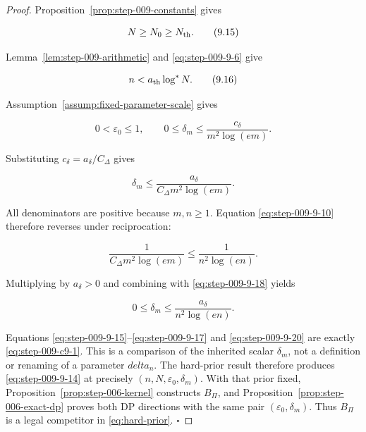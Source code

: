 \begin{proof}
Proposition~\ref{prop:step-009-constants} gives

\[
N\ge N_0\ge N_{\rm th}.
\tag{9.15}\label{eq:step-009-9-15}
\]

Lemma~\ref{lem:step-009-arithmetic} and \eqref{eq:step-009-9-6} give

\[
n<a_{\rm th}\log^*N.
\tag{9.16}\label{eq:step-009-9-16}
\]

Assumption~\ref{assump:fixed-parameter-scale} gives

\[
0<\varepsilon_0\le1,
\qquad
0\le\delta_m
\le\frac{c_\delta}{m^2\log(em)}.
\tag{9.17}\label{eq:step-009-9-17}
\]

Substituting \(c_\delta=a_\delta/C_\Delta\) gives

\[
\delta_m
\le
\frac{a_\delta}{C_\Delta m^2\log(em)}.
\tag{9.18}\label{eq:step-009-9-18}
\]

All denominators are positive because \(m,n\ge1\).  Equation \eqref{eq:step-009-9-10}
therefore reverses under reciprocation:

\[
\frac1{C_\Delta m^2\log(em)}
\le
\frac1{n^2\log(en)}.
\tag{9.19}\label{eq:step-009-9-19}
\]

Multiplying by \(a_\delta>0\) and combining with \eqref{eq:step-009-9-18} yields

\[
0\le\delta_m
\le\frac{a_\delta}{n^2\log(en)}.
\tag{9.20}\label{eq:step-009-9-20}
\]

Equations \eqref{eq:step-009-9-15}--\eqref{eq:step-009-9-17} and \eqref{eq:step-009-9-20} are exactly \eqref{eq:step-009-c9-1}.  This is a
comparison of the inherited scalar \(\delta_m\), not a definition or
renaming of a parameter \(delta_n\).  The hard-prior result
therefore produces \eqref{eq:step-009-9-14} at precisely
\((n,N,\varepsilon_0,\delta_m)\).  With that prior fixed,
Proposition~\ref{prop:step-006-kernel} constructs \(B_\Pi\), and
Proposition~\ref{prop:step-006-exact-dp} proves both DP directions with
the same pair \((\varepsilon_0,\delta_m)\).  Thus \(B_\Pi\) is a legal
competitor in \eqref{eq:hard-prior}.  \(\square\)

\end{proof}


